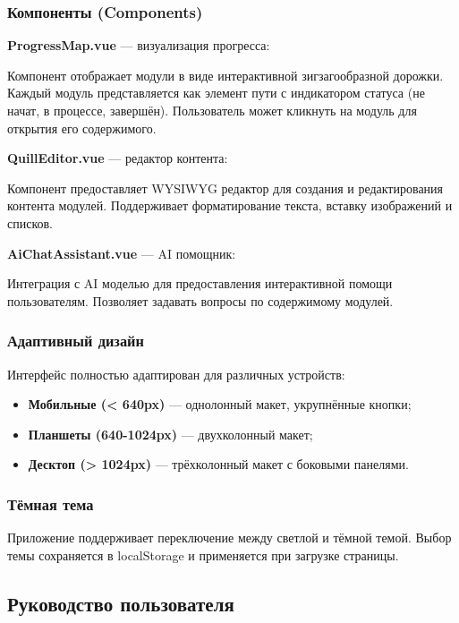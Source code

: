 \subsubsection{Компоненты (Components)}

\textbf{ProgressMap.vue} --- визуализация прогресса:

Компонент отображает модули в виде интерактивной зигзагообразной дорожки. Каждый модуль представляется как элемент пути с индикатором статуса (не начат, в процессе, завершён). Пользователь может кликнуть на модуль для открытия его содержимого.

\textbf{QuillEditor.vue} --- редактор контента:

Компонент предоставляет WYSIWYG редактор для создания и редактирования контента модулей. Поддерживает форматирование текста, вставку изображений и списков.

\textbf{AiChatAssistant.vue} --- AI помощник:

Интеграция с AI моделью для предоставления интерактивной помощи пользователям. Позволяет задавать вопросы по содержимому модулей.

\subsubsection{Адаптивный дизайн}

Интерфейс полностью адаптирован для различных устройств:
\begin{itemize}
    \item \textbf{Мобильные (< 640px)} --- однолонный макет, укрупнённые кнопки;
    \item \textbf{Планшеты (640-1024px)} --- двухколонный макет;
    \item \textbf{Десктоп (> 1024px)} --- трёхколонный макет с боковыми панелями.
\end{itemize}

\subsubsection{Тёмная тема}

Приложение поддерживает переключение между светлой и тёмной темой. Выбор темы сохраняется в localStorage и применяется при загрузке страницы.


\subsection{Руководство пользователя}

